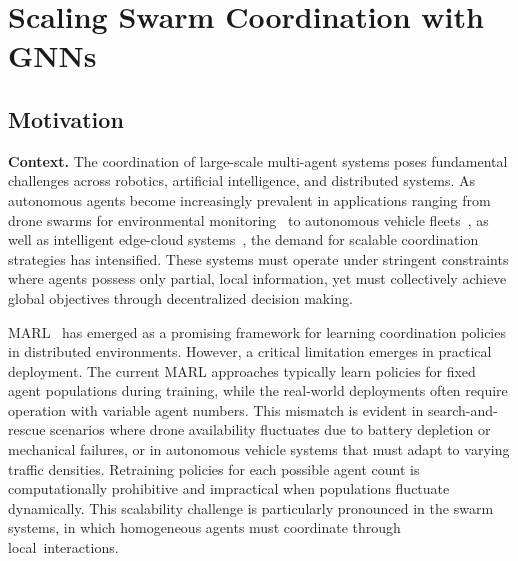 
\section{Scaling Swarm Coordination with GNNs}
\label{sec:scalable-rl-gnn}

\subsection{Motivation}
\textbf{Context.} 
The coordination of large-scale multi-agent systems poses fundamental challenges across 
 robotics, artificial intelligence, and distributed systems. 
%
As autonomous agents become increasingly prevalent in applications ranging 
 from drone swarms for environmental monitoring~\cite{DBLP:journals/firai/SchranzUSE20} 
 to autonomous vehicle fleets~\cite{DBLP:journals/jiii/TahirBHTP19}, 
 as well as intelligent edge-cloud systems~\cite{DBLP:journals/fgcs/FarabegoliDAV26},
 the demand for scalable coordination strategies has intensified. 
%
These systems must operate under stringent constraints where agents possess only partial, 
 local information, yet must collectively achieve global objectives 
 through decentralized decision making.

\gls{MARL}~\cite{DBLP:journals/sensors/OrrD23} has emerged as a promising framework 
 for learning coordination policies in distributed environments. 
%
However, 
 a critical limitation emerges in practical deployment. 
%
The current \gls{MARL} approaches typically learn policies for fixed agent populations during training, 
 while the real-world deployments often require operation with variable agent numbers. 
%
This mismatch is evident in search-and-rescue scenarios where drone availability fluctuates 
 due to battery depletion or mechanical failures, 
 or in autonomous vehicle systems that must adapt to varying traffic densities. 
%
Retraining policies for each possible agent count is computationally prohibitive 
 and impractical when populations fluctuate dynamically.
%
This scalability challenge is particularly pronounced in the swarm systems, 
 in which homogeneous agents must coordinate through \mbox{local interactions}. 

